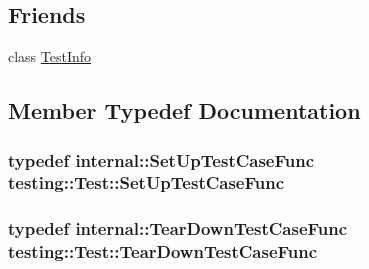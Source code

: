 \subsection*{Friends}
\begin{DoxyCompactItemize}
\item 
class \hyperlink{classtesting_1_1Test_a4c49c2cdb6c328e6b709b4542f23de3c}{Test\-Info}
\end{DoxyCompactItemize}


\subsection{Member Typedef Documentation}
\hypertarget{classtesting_1_1Test_a5f2a051d1d99c9b784c666c586186cf9}{
\subsubsection[{Set\-Up\-Test\-Case\-Func}]{\setlength{\rightskip}{0pt plus 5cm}typedef internal\-::\-Set\-Up\-Test\-Case\-Func {\bf testing\-::\-Test\-::\-Set\-Up\-Test\-Case\-Func}}}\label{classtesting_1_1Test_a5f2a051d1d99c9b784c666c586186cf9}
\hypertarget{classtesting_1_1Test_aa0f532e93b9f3500144c53f31466976c}{
\subsubsection[{Tear\-Down\-Test\-Case\-Func}]{\setlength{\rightskip}{0pt plus 5cm}typedef internal\-::\-Tear\-Down\-Test\-Case\-Func {\bf testing\-::\-Test\-::\-Tear\-Down\-Test\-Case\-Func}}}\label{classtesting_1_1Test_aa0f532e93b9f3500144c53f31466976c}


